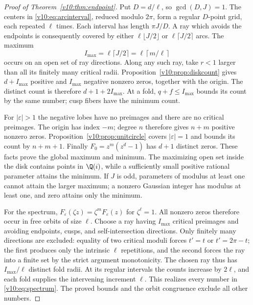 \documentclass[UTF8,11pt]{ctexart}
\theoremstyle{definition}
\numberwithin{equation}{section}
\begin{document}
\begin{proof}[Proof of Theorem~\ref{v10:thm:endpoint}]
Put $D=d/\ell$, so $\gcd(D,J)=1$.
The centers in \eqref{v10:eq:arcinterval}, reduced modulo
$2\pi$, form a regular $D$-point grid, each repeated $\ell$
times. Each interval has length $\pi J/D$. A ray which avoids
the endpoints is consequently covered by either
$\ell\lfloor J/2\rfloor$ or $\ell\lceil J/2\rceil$ arcs.
The maximum
\[
 I_{\max}=\ell\lceil J/2\rceil
          =\ell\left\lceil m/\ell\right\rceil
\]
occurs on an open set of ray directions. Along any such ray,
take $r<1$ larger than all its finitely many critical radii.
Proposition~\ref{v10:prop:diskcount} gives $d+I_{\max}$ positive
and $I_{\max}$ negative nonzero zeros, together with the origin.
The distinct count is therefore $d+1+2I_{\max}$.
At a fold, $q+f\le I_{\max}$ bounds its count by the same
number; cusp fibers have the minimum count.

For $|\varepsilon|>1$ the negative lobes have no preimages and
there are no critical preimages. The origin has index $-m$;
degree $n$ therefore gives $n+m$ positive nonzero zeros.
Proposition~\ref{v10:prop:unitcircle} covers $|\varepsilon|=1$
and bounds its count by $n+m+1$.
Finally $F_0=z^m(z^d-1)$ has $d+1$ distinct zeros.
These facts prove the global maximum and minimum.
The maximizing open set inside the disk contains points in
$\Q(i)$, while a sufficiently small positive rational parameter
attains the minimum. If $J$ is odd, parameters of modulus at
least one cannot attain the larger maximum; a nonzero
Gaussian integer has modulus at least one, and zero attains
only the minimum.

For the spectrum, $F_\varepsilon(\zeta z)=\zeta^mF_\varepsilon(z)$
for $\zeta^\ell=1$. All nonzero zeros therefore occur in free
orbits of size $\ell$. Choose a ray having $I_{\max}$ critical
preimages and avoiding endpoints, cusps, and self-intersection
directions. Only finitely many directions are excluded:
equality of two critical moduli forces $t'=t$ or $t'=2\pi-t$;
the first produces only the intrinsic $\ell$ repetitions,
and the second forces the ray into a finite set by the strict
argument monotonicity. The chosen ray thus has
$I_{\max}/\ell$ distinct fold radii. At its regular intervals
the counts increase by $2\ell$, and each fold supplies the
intervening increment $\ell$. This realizes every number in
\eqref{v10:eq:spectrum}. The proved bounds and the orbit
congruence exclude all other numbers.
\end{proof}
\end{document}
